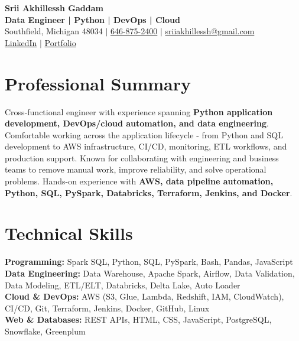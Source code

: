 \documentclass[letterpaper,10pt]{article}
\begin{document}
\fontsize{9.35pt}{10.45pt}\selectfont

\begin{center}
    {\LARGE \textbf{Srii Akhillessh Gaddam}} \\[-1pt]
    \textbf{Data Engineer | Python | DevOps | Cloud} \\[2pt]
    Southfield, Michigan 48034 $|$
    \href{tel:6468752400}{646-875-2400} $|$
    \href{mailto:sriiakhillessh@gmail.com}{sriiakhillessh@gmail.com} \\[1pt]
    \href{https://www.linkedin.com/in/srii-akhiilessh-gaddam-b48668191/}{LinkedIn} $|$
    \href{https://sriiakhillesshg.github.io/portfolio/}{Portfolio}
\end{center}
\vspace{-8pt}

\section{Professional Summary}
\small{Cross-functional engineer with experience spanning \textbf{Python application development, DevOps/cloud automation, and data engineering}. Comfortable working across the application lifecycle - from Python and SQL development to AWS infrastructure, CI/CD, monitoring, ETL workflows, and production support. Known for collaborating with engineering and business teams to remove manual work, improve reliability, and solve operational problems. Hands-on experience with \textbf{AWS, data pipeline automation, Python, SQL, PySpark, Databricks, Terraform, Jenkins, and Docker}.}

\section{Technical Skills}
\small{
\textbf{Programming:} Spark SQL, Python, SQL, PySpark, Bash, Pandas, JavaScript \\
\textbf{Data Engineering:} Data Warehouse, Apache Spark, Airflow, Data Validation, Data Modeling, ETL/ELT, Databricks, Delta Lake, Auto Loader \\
\textbf{Cloud \& DevOps:} AWS (S3, Glue, Lambda, Redshift, IAM, CloudWatch), CI/CD, Git, Terraform, Jenkins, Docker, GitHub, Linux \\
\textbf{Web \& Databases:} REST APIs, HTML, CSS, JavaScript, PostgreSQL, Snowflake, Greenplum
}
\end{document}
